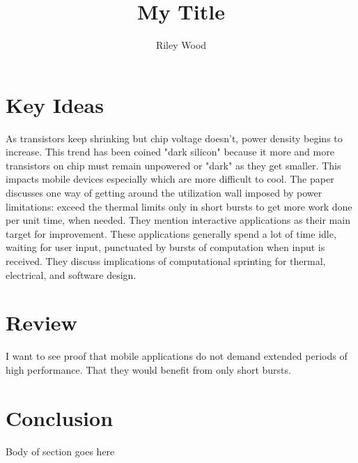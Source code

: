 \documentclass{article}
\title{My Title}
\author{Riley Wood}
\begin{document}
\maketitle


\section*{Key Ideas} 
As transistors keep shrinking but chip voltage doesn't, power density begins to
increase. This trend has been coined "dark silicon" because it more and more
transistors on chip must remain unpowered or "dark" as they get smaller. This
impacts mobile devices especially which are more difficult to cool. The paper
discusses one way of getting around the utilization wall imposed by power
limitations: exceed the thermal limits only in short bursts to get more work
done per unit time, when needed. They mention interactive applications as their
main target for improvement. These applications generally spend a lot of time
idle, waiting for user input, punctuated by bursts of computation when input is
received. They discuss implications of computational sprinting for thermal,
electrical, and software design.

\section*{Review}
I want to see proof that mobile applications do not demand extended periods of
high performance. That they would benefit from only short bursts.

\section*{Conclusion}
Body of section goes here






\end{document}
